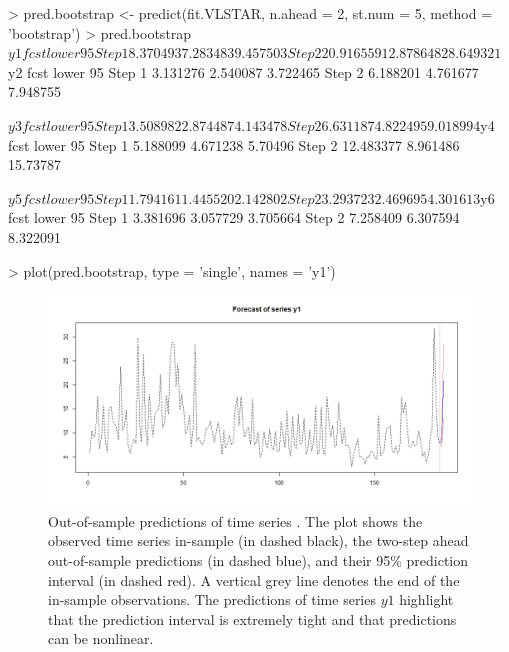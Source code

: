 		
		
%
\begin{example}
> pred.bootstrap <- predict(fit.VLSTAR, n.ahead = 2, st.num = 5, method = 'bootstrap')
> pred.bootstrap
$y1
		   fcst lower 95%
Step 1  8.370493  7.283483  9.457503
Step 2 20.916559 12.878648 28.649321

$y2
		   fcst lower 95%
Step 1 3.131276  2.540087  3.722465
Step 2 6.188201  4.761677  7.948755

$y3
		   fcst lower 95%
Step 1 3.508982  2.874487  4.143478
Step 2 6.631187  4.822495  9.018994

$y4
		   fcst lower 95%
Step 1  5.188099  4.671238   5.70496
Step 2 12.483377  8.961486  15.73787

$y5
		   fcst lower 95%
Step 1 1.794161  1.445520  2.142802
Step 2 3.293723  2.469695  4.301613

$y6
		   fcst lower 95%
Step 1 3.381696  3.057729  3.705664
Step 2 7.258409  6.307594  8.322091
\end{example}
%
				
%
\begin{example}

> plot(pred.bootstrap, type = 'single', names = 'y1')

\end{example}
%
				
				
\begin{figure}[H]
					\centering
					\includegraphics[width = \columnwidth]{pred.bootstrap}
					\caption{\label{fig:Figure2} Out-of-sample predictions of time series . The plot shows the observed time series in-sample (in dashed black), the two-step ahead out-of-sample predictions (in dashed blue), and their 95\% prediction interval (in dashed red). A vertical grey line denotes the end of the in-sample observations. The predictions of time series $y1$ highlight that the prediction interval is extremely tight and that predictions can be nonlinear.}
\end{figure}
				
